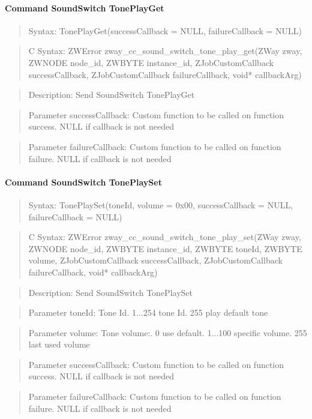 \paragraph{Command SoundSwitch TonePlayGet}
\begin{quote}Syntax: TonePlayGet(successCallback = NULL, failureCallback = NULL)\end{quote}
\begin{quote}C Syntax: ZWError zway\_cc\_sound\_switch\_tone\_play\_get(ZWay zway, ZWNODE node\_id, ZWBYTE instance\_id, ZJobCustomCallback successCallback, ZJobCustomCallback failureCallback, void* callbackArg)\end{quote}
\begin{quote}Description: Send SoundSwitch TonePlayGet\end{quote}
\begin{quote}Parameter successCallback: Custom function to be called on function success. NULL if callback is not needed\end{quote}
\begin{quote}Parameter failureCallback: Custom function to be called on function failure. NULL if callback is not needed\end{quote}


\paragraph{Command SoundSwitch TonePlaySet}
\begin{quote}Syntax: TonePlaySet(toneId, volume = 0x00, successCallback = NULL, failureCallback = NULL)\end{quote}
\begin{quote}C Syntax: ZWError zway\_cc\_sound\_switch\_tone\_play\_set(ZWay zway, ZWNODE node\_id, ZWBYTE instance\_id, ZWBYTE toneId, ZWBYTE volume, ZJobCustomCallback successCallback, ZJobCustomCallback failureCallback, void* callbackArg)\end{quote}
\begin{quote}Description: Send SoundSwitch TonePlaySet\end{quote}
\begin{quote}Parameter toneId: Tone Id. 1...254 tone Id. 255 play default tone\end{quote}
\begin{quote}Parameter volume: Tone volume:. 0 use default. 1...100 specific volume. 255 last used volume\end{quote}
\begin{quote}Parameter successCallback: Custom function to be called on function success. NULL if callback is not needed\end{quote}
\begin{quote}Parameter failureCallback: Custom function to be called on function failure. NULL if callback is not needed\end{quote}


